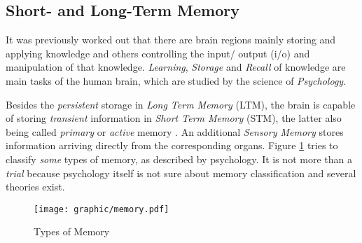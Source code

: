 %
%
%
%
%
%
%

\subsection{Short- and Long-Term Memory}
\label{short_and_long_term_memory_heading}

It was previously worked out that there are brain regions mainly storing and
applying knowledge and others controlling the input/ output (i/o) and
manipulation of that knowledge. \emph{Learning}, \emph{Storage} and
\emph{Recall} of knowledge are main tasks of the human brain, which are studied
by the science of \emph{Psychology}.

Besides the \emph{persistent} storage in \emph{Long Term Memory} (LTM), the brain
is capable of storing \emph{transient} information in \emph{Short Term Memory}
(STM), the latter also being called \emph{primary} or \emph{active} memory
\cite{wikipedia}. An additional \emph{Sensory Memory} stores information arriving
directly from the corresponding organs. Figure \ref{memory_figure} tries to
classify \emph{some} types of memory, as described by psychology. It is not
more than a \emph{trial} because psychology itself is not sure about memory
classification and several theories exist.

\begin{figure}[ht]
    \begin{center}
        \texttt{[image: graphic/memory.pdf]}
        \caption{Types of Memory \cite{lai, eet}}
        \label{memory_figure}
    \end{center}
\end{figure}

